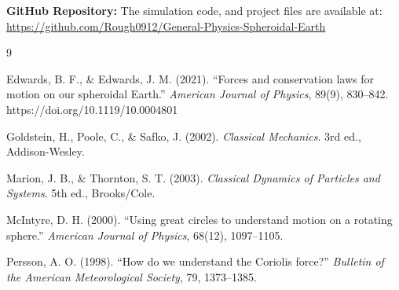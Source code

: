 \documentclass[10pt, a4paper]{article}
\begin{document}
\vspace{0.5cm}
\noindent \textbf{GitHub Repository:} The simulation code, and project files are available at: \\
\url{https://github.com/Rough0912/General-Physics-Spheroidal-Earth}

\begin{thebibliography}{9}

Edwards, B. F., \& Edwards, J. M. (2021). ``Forces and conservation laws for motion on our spheroidal Earth.'' \textit{American Journal of Physics}, 89(9), 830--842. https://doi.org/10.1119/10.0004801

Goldstein, H., Poole, C., \& Safko, J. (2002). \textit{Classical Mechanics}. 3rd ed., Addison-Wesley.

Marion, J. B., \& Thornton, S. T. (2003). \textit{Classical Dynamics of Particles and Systems}. 5th ed., Brooks/Cole.

McIntyre, D. H. (2000). ``Using great circles to understand motion on a rotating sphere.'' \textit{American Journal of Physics}, 68(12), 1097--1105.

Persson, A. O. (1998). ``How do we understand the Coriolis force?'' \textit{Bulletin of the American Meteorological Society}, 79, 1373--1385.

\end{thebibliography}
\end{document}
